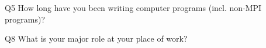 \begin{description}%
\item{Q5} How long have you been writing computer programs (incl. non-MPI programs)?%
\item{Q8} What is your major role at your place of work?%
\end{description}%

